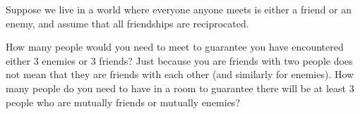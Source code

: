 \documentclass[11pt]{exam}
\begin{document}
Suppose we live in a world where everyone anyone meets is either a friend or an enemy, and assume that all friendships are reciprocated. 
\begin{questions}
\question How many people would you need to meet to guarantee you have encountered either 3 enemies or 3 friends?
\vfill
\question Just because you are friends with two people does not mean that they are friends with each other (and similarly for enemies). How many people do you need to have in a room to guarantee there will be at least 3 people who are mutually friends or mutually enemies?
\vfill
\vfill
\end{questions}


\end{document}
